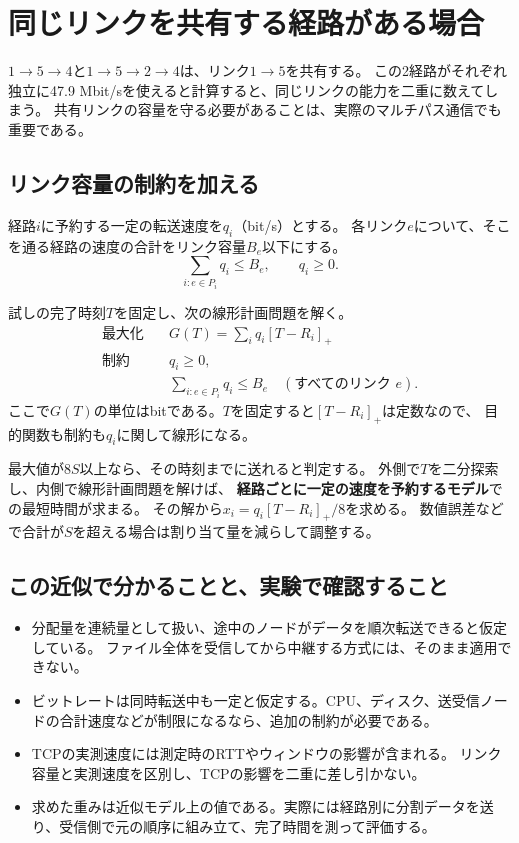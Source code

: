 \documentclass[a4paper,11pt]{article}
\newcommand{\route}[1]{\ensuremath{#1}}
\newcommand{\positive}[1]{\left[#1\right]_{+}}
\begin{document}
\newpage
\section{同じリンクを共有する経路がある場合}

\route{1\to5\to4}と\route{1\to5\to2\to4}は、リンク\route{1\to5}を共有する。
この2経路がそれぞれ独立に47.9 Mbit/sを使えると計算すると、同じリンクの能力を二重に数えてしまう。
共有リンクの容量を守る必要があることは、実際のマルチパス通信でも重要である\cite{rfc6356}。

\subsection{リンク容量の制約を加える}
経路$i$に予約する一定の転送速度を$q_i$（bit/s）とする。
各リンク$e$について、そこを通る経路の速度の合計をリンク容量$B_e$以下にする。
\begin{equation}
  \boxed{\sum_{i:e\in P_i}q_i\le B_e},\qquad q_i\ge0.
  \label{eq:shared}
\end{equation}

試しの完了時刻$T$を固定し、次の線形計画問題を解く。
\begin{equation}
\begin{aligned}
 \text{最大化}\quad &G(T)=\sum_i q_i\positive{T-R_i}\\
 \text{制約}\quad &q_i\ge0,\\
                 &\sum_{i:e\in P_i}q_i\le B_e
                   \quad(\text{すべてのリンク }e).
\end{aligned}
\label{eq:lp}
\end{equation}
ここで$G(T)$の単位はbitである。$T$を固定すると$\positive{T-R_i}$は定数なので、
目的関数も制約も$q_i$に関して線形になる。

最大値が$8S$以上なら、その時刻までに送れると判定する。
外側で$T$を二分探索し、内側で線形計画問題を解けば、
\textbf{経路ごとに一定の速度を予約するモデル}での最短時間が求まる。
その解から$x_i=q_i\positive{T-R_i}/8$を求める。
数値誤差などで合計が$S$を超える場合は割り当て量を減らして調整する。

\subsection{この近似で分かることと、実験で確認すること}
\begin{itemize}
 \item 分配量を連続量として扱い、途中のノードがデータを順次転送できると仮定している。
 ファイル全体を受信してから中継する方式には、そのまま適用できない。
 \item ビットレートは同時転送中も一定と仮定する。CPU、ディスク、送受信ノードの合計速度などが制限になるなら、追加の制約が必要である。
 \item TCPの実測速度には測定時のRTTやウィンドウの影響が含まれる。
 リンク容量と実測速度を区別し、TCPの影響を二重に差し引かない。
 \item 求めた重みは近似モデル上の値である。実際には経路別に分割データを送り、受信側で元の順序に組み立て、完了時間を測って評価する。
\end{itemize}
\end{document}
